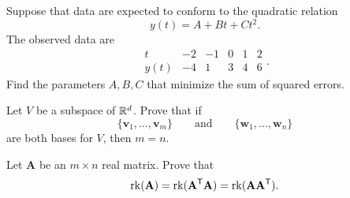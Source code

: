 \documentclass[11pt,oneside]{article}
\begin{document}
\begin{problem}
Suppose that data are expected to conform to the quadratic relation
\[
y(t)=A+Bt+Ct^2.
\]
The observed data are
\[
\begin{array}{c|ccccc}
t&-2&-1&0&1&2\\ \hline
y(t)&-4&1&3&4&6
\end{array}.
\]
Find the parameters $A,B,C$ that minimize the sum of squared errors.
\end{problem}

\begin{problem}
Let $V$ be a subspace of $\mathbb{R}^d$. Prove that if
\[
\{\mathbf v_1,\dots,\mathbf v_m\}
\qquad\text{and}\qquad
\{\mathbf w_1,\dots,\mathbf w_n\}
\]
are both bases for $V$, then $m=n$.
\end{problem}

\begin{problem}
Let $\mathbf A$ be an $m\times n$ real matrix. Prove that
\[
\operatorname{rk}(\mathbf A)=\operatorname{rk}(\mathbf A^{\mathsf T}\mathbf A)=\operatorname{rk}(\mathbf A\mathbf A^{\mathsf T}).
\]
\end{problem}
\end{document}
